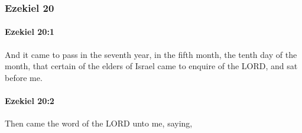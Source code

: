 	\subsubsection{Ezekiel 20} %
		\label{EZEKIEL-20}

		\paragraph{Ezekiel 20:1} %
			\label{EZEKIEL-20-1}

			And it came to pass in the seventh year, in the fifth month, the tenth day of the month, that certain of the elders of Israel came to enquire of the LORD, and sat before me.


		\paragraph{Ezekiel 20:2} %
			\label{EZEKIEL-20-2}

			Then came the word of the LORD unto me, saying,

